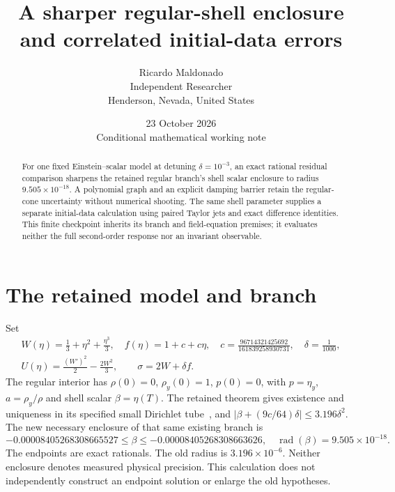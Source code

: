 \documentclass[11pt]{article}
\title{A sharper regular-shell enclosure\\and correlated initial-data errors}
\author{Ricardo Maldonado\\Independent Researcher\\Henderson, Nevada, United States}
\date{23 October 2026\\Conditional mathematical working note}
\begin{document}
\maketitle
\begin{abstract}
For one fixed Einstein--scalar model at detuning $\delta=10^{-3}$, an exact
rational residual comparison sharpens the retained regular branch's shell
scalar enclosure to radius $9.505\times10^{-18}$. A polynomial graph and an
explicit damping barrier retain the regular-cone uncertainty without numerical
shooting. The same shell parameter supplies a separate initial-data calculation
using paired Taylor jets and exact difference identities. This finite checkpoint
inherits its branch and field-equation premises; it evaluates neither the full
second-order response nor an invariant observable.
\end{abstract}

\section{The retained model and branch}
Set
\begin{gather}
 W(\eta)=\frac13+\eta^2+\frac{\eta^3}{3},\quad
 f(\eta)=1+c+c\eta,\quad
 c=\frac{96714321425692}{161839258930731},\quad\delta=\frac1{1000},\label{eq:model}\\
 U(\eta)=\frac{(W')^2}{2}-\frac{2W^2}{3},\qquad \sigma=2W+\delta f.
\end{gather}
The regular interior has $\rho(0)=0$, $\rho_y(0)=1$, $p(0)=0$,
with $p=\eta_y$, $a=\rho_y/\rho$ and shell scalar $\beta=\eta(T)$.
The retained theorem gives existence and uniqueness in its specified small
Dirichlet tube~\cite{branch}, and
$|\beta+(9c/64)\delta|\leq3.196\delta^2$. The new necessary enclosure of
that same existing branch is
\begin{equation}
 \boxed{-0.00008405268308665527\leq\beta\leq
              -0.00008405268308663626},\quad
 \operatorname{rad}(\beta)=9.505\times10^{-18}.\label{eq:beta}
\end{equation}
The endpoints are exact rationals. The old radius is $3.196\times10^{-6}$.
Neither enclosure denotes measured physical precision. This calculation does
not independently construct an endpoint solution or enlarge the old hypotheses.
\end{document}
